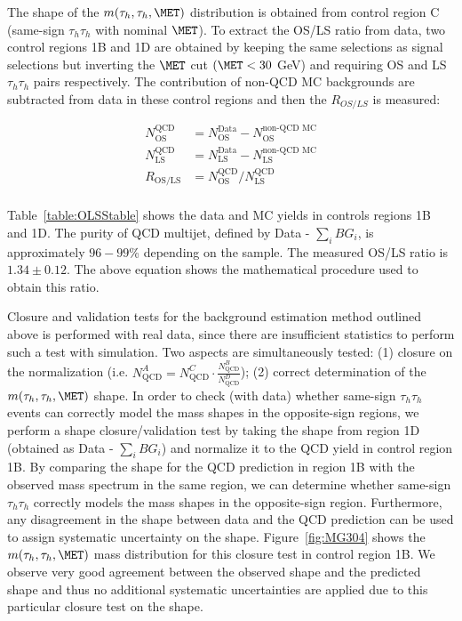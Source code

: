The shape of the $m(\tau_{h},\tau_{h},\MET)$ distribution is obtained from control region C (same-sign $\tau_{h}\tau_{h}$ with nominal $\MET$). To extract the OS/LS ratio from data, two control regions 1B and 1D are obtained by keeping the same selections as signal selections but inverting the $\MET$ cut $(\MET < 30$ GeV) and requiring OS and LS $\tau_{h}\tau_{h}$ pairs respectively. The contribution of non-QCD MC backgrounds are subtracted from data in these control regions and then the $R_{OS/LS}$ is measured:

\begin{equation}
  \begin{aligned}
    N^{\textrm{QCD}}_{\textrm{OS}} &= N^{\textrm{Data}}_{\textrm{OS}} - N^{\textrm{non-QCD MC}}_{\textrm{OS}} \\
    N^{\textrm{QCD}}_{\textrm{LS}} &= N^{\textrm{Data}}_{\textrm{LS}} - N^{\textrm{non-QCD MC}}_{\textrm{LS}} \\
    R_{\textrm{OS/LS}} &= N^{\textrm{QCD}}_{\textrm{OS}}/N^{\textrm{QCD}}_{\textrm{LS}} \\
\end{aligned}\label{eqn:OSLSratio}
\end{equation}

Table~\ref{table:OLSStable} shows the data and MC yields in controls regions 1B and 1D. The purity of QCD multijet, defined by Data - $\sum\limits_{i} BG_{i}$, is approximately $96-99$\% depending on the sample. The measured OS/LS ratio is $1.34\pm0.12$. The above equation shows the mathematical procedure used to obtain this ratio. 

Closure and validation tests for the background estimation method outlined above is performed with real data, since there are insufficient statistics to perform such a test with simulation. Two aspects are simultaneously tested: (1) closure on the normalization (i.e. $N_{\textrm{QCD}}^{A} = N_{\textrm{QCD}}^{C} \cdot \frac{N_{\textrm{QCD}}^{B}}{N_{\textrm{QCD}}^{D}}$); (2) correct determination of the $m(\tau_{h},\tau_{h},\MET)$ shape. In order to check (with data) whether same-sign $\tau_{h}\tau_{h}$ events can correctly model the mass shapes in the opposite-sign regions, we perform a shape closure/validation test by taking the shape from region 1D (obtained as Data - $\sum\limits_{i} BG_{i}$) and normalize it to the QCD yield in control region 1B. By comparing the shape for the QCD prediction in region 1B with the observed mass spectrum in the same region, we can determine whether same-sign $\tau_{h}\tau_{h}$ correctly models the mass shapes in the opposite-sign region. Furthermore, any disagreement in the shape between data and the QCD prediction can be used to assign systematic uncertainty on the shape. Figure~\ref{fig:MG304} shows the $m(\tau_{h},\tau_{h},\MET)$ mass distribution for this closure test in control region 1B. We observe very good agreement between the observed shape and the predicted shape and thus no additional systematic uncertainties are applied due to this particular closure test on the shape. 

